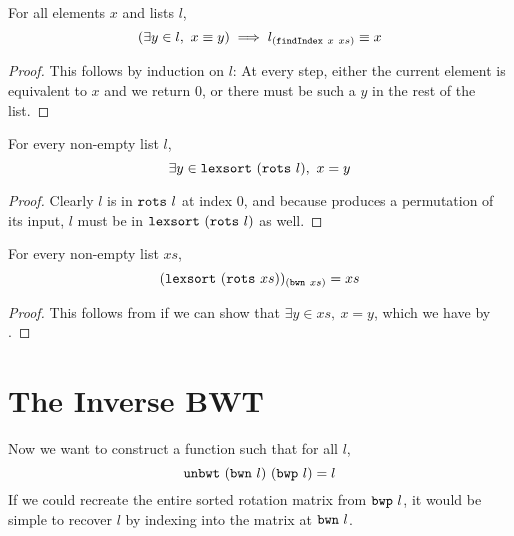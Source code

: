 \documentclass[11pt]{thesis}
\begin{document}
\begin{lemma}
  For all elements $x$ and lists $l$,
  \begin{equation*}
    (\exists y \in l,~x \equiv y) \implies l_{(\texttt{findIndex}~x~xs)} \equiv x
  \end{equation*}
  \begin{proof}
    This follows by induction on $l$: At every step, either the
    current element is equivalent to $x$ and we return $0$, or there
    must be such a $y$ in the rest of the list.
  \end{proof}
\end{lemma}

\begin{lemma}
  For every non-empty list $l$,
  \begin{equation*}
    \exists y \in \texttt{lexsort}~(\texttt{rots}~l),~x = y
  \end{equation*}
  \begin{proof}
    Clearly $l$ is in $\texttt{rots}~l$ at index 0, and because
     produces a permutation of its input, $l$ must be
    in $\texttt{lexsort}~(\texttt{rots}~l)$ as well.
  \end{proof}
\end{lemma}

\begin{theorem}
  For every non-empty list $xs$,
  \begin{equation*}
    (\texttt{lexsort}~(\texttt{rots}~xs))_{(\texttt{bwn}~xs)} = xs
  \end{equation*}
  \begin{proof}
    This follows from  if we can show that
    $\exists y \in xs,~x = y$, which we have by .
  \end{proof}
\end{theorem}

\section{The Inverse BWT}
\label{sec:inverse_BWT}

Now we want to construct a function  such that for all $l$,
\begin{equation}
  \texttt{unbwt}~(\texttt{bwn}~l)~(\texttt{bwp}~l) = l
  \label{eq:unbwt}
\end{equation}
If we could recreate the entire sorted rotation matrix from
$\texttt{bwp}~l$, it would be simple to recover $l$ by indexing into
the matrix at $\texttt{bwn}~l$.
\end{document}

